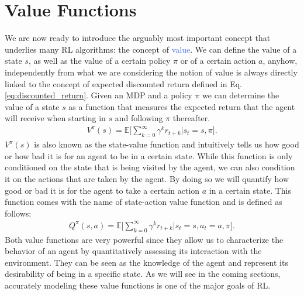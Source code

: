 \section{Value Functions}
We are now ready to introduce the arguably most important concept that underlies many RL algorithms: the concept of \textcolor{RoyalBlue}{value}. We can define the value of a state $s$, as well as the value of a certain policy $\pi$ or of a certain action $a$, anyhow, independently from what we are considering the notion of value is always directly linked to the concept of expected discounted return defined in Eq. \ref{eq:discounted_return}. Given an MDP and a policy $\pi$ we can determine the value of a state $s$ as a function that measures the expected return that the agent will receive when starting in $s$ and following $\pi$ thereafter. 
\begin{align}
    V^{\pi}(s)=\mathds{E}\bigg[\sum_{k=0}^{\infty}\gamma^{k}r_{t+k}\bigg| s_t = s, \pi \bigg].
    \label{eq:state_value_function}
\end{align}
$V^{\pi}(s)$ is also known as the state-value function and intuitively tells us how good or how bad it is for an agent to be in a certain state. While this function is only conditioned on the state that is being visited by the agent, we can also condition it on the actions that are taken by the agent. By doing so we will quantify how good or bad it is for the agent to take a certain action $a$ in a certain state. This function comes with the name of state-action value function and is defined as follows:
\begin{align}
     Q^{\pi}(s,a)=\mathds{E}\bigg[\sum_{k=0}^{\infty}\gamma^{k}r_{t+k} \bigg| s_t = s, a_t=a, \pi\bigg].
 \end{align}
Both value functions are very powerful since they allow us to characterize the behavior of an agent by quantitatively assessing its interaction with the environment. They can be seen as the knowledge of the agent and represent its desirability of being in a specific state. As we will see in the coming sections, accurately modeling these value functions is one of the major goals of RL.  

